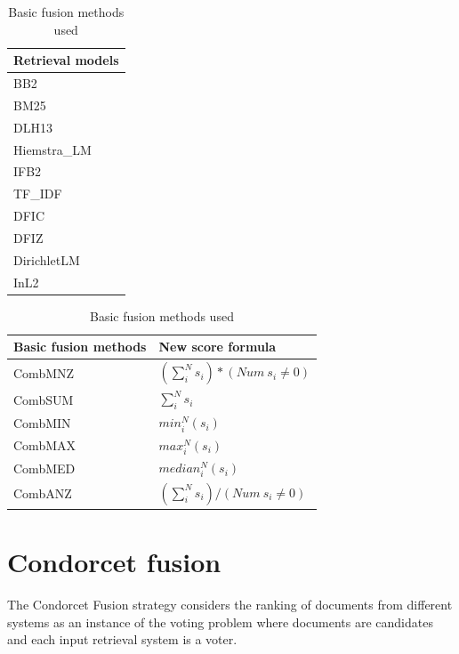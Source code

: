 	\begin{table} [H]
		\begin{minipage} {0.2\linewidth}
			\centering
			\begin{tabular}{l}
				\toprule
				\textbf{Retrieval models} \\ \toprule
				BB2 \\
				BM25 \\
				DLH13 \\
				Hiemstra\_LM \\
				IFB2 \\
				TF\_IDF \\
				DFIC \\
				DFIZ \\
				DirichletLM \\
				InL2 \\
				\bottomrule
			\end{tabular}
			\caption{Retrieval models used}
			\label{tab:10Mod}
		\end{minipage}		
		\begin{minipage} {0.8\linewidth}
			\centering
			{\def\arraystretch{2}\tabcolsep=10pt
			\begin{tabular}{l p{5cm}}
				\toprule
				\textbf{Basic fusion methods} & \textbf{New score formula} \\ \toprule
				CombMNZ & $(\sum_{i}^{N} s_{i})*(Num~s_{i}\ne 0)$ \\ \hline
				CombSUM & $ \sum_{i}^{N} s_{i} $ \\ \hline
				CombMIN & $ min_{i}^{N} {(s_{i})} $ \\ \hline
				CombMAX & $ max_{i}^{N} {(s_{i})} $  \\ \hline
				CombMED & $ median_{i}^{N} {(s_{i})} $ \\ \hline
				CombANZ & $  (\sum_{i}^{N} s_{i}) /
							(Num ~ s_{i} \ne 0)$   \\ 
							\bottomrule
			\end{tabular}}
			\caption{Basic fusion methods used }
			\label{tab:6Fus}
		\end{minipage}		
	\end{table}
    
    \section{Condorcet fusion}
    The Condorcet Fusion strategy considers the ranking of documents from different systems as an instance of the voting problem where documents are candidates and each input retrieval system is a voter.
    
